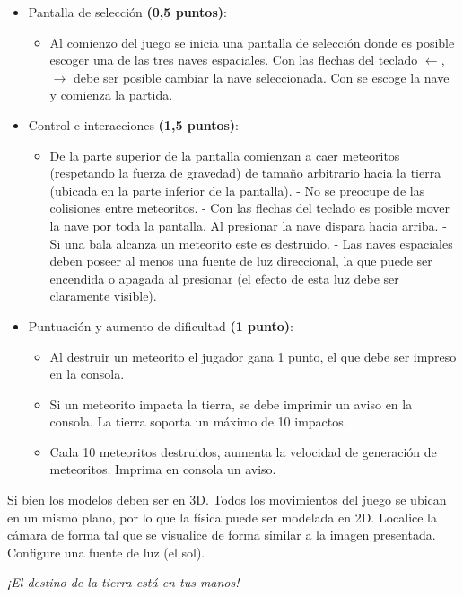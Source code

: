 \documentclass[letterpaper,11pt]{article} %
\begin{document}
\begin{itemize}
\item Pantalla de selección \textbf{(0,5 puntos)}:

\begin{itemize}
	\item Al comienzo del juego se inicia una pantalla de selección donde es posible escoger una de las tres naves espaciales. Con las flechas del teclado $\leftarrow$, $\rightarrow$ debe ser posible cambiar la nave seleccionada. Con  se escoge la nave y comienza la partida.
\end{itemize}

\item Control e interacciones \textbf{(1,5 puntos)}:

\begin{itemize}
	\item De la parte superior de la pantalla comienzan a caer meteoritos (respetando la fuerza de gravedad) de tamaño arbitrario hacia la tierra (ubicada en la parte inferior de la pantalla).
	- No se preocupe de las colisiones entre meteoritos.
	- Con las flechas del teclado es posible mover la nave por toda la pantalla. Al presionar  la nave dispara hacia arriba.
	- Si una bala alcanza un meteorito este es destruido.
	- Las naves espaciales deben poseer al menos una fuente de luz direccional, la que puede ser encendida o apagada al presionar  (el efecto de esta luz debe ser claramente visible).
\end{itemize}

\item Puntuación y aumento de dificultad \textbf{(1 punto)}:

\begin{itemize}
	\item Al destruir un meteorito el jugador gana 1 punto, el que debe ser impreso en la consola.
	\item Si un meteorito impacta la tierra, se debe imprimir un aviso en la consola. La tierra soporta un máximo de 10 impactos.
	\item Cada 10 meteoritos destruidos, aumenta la velocidad de generación de meteoritos. Imprima en consola un aviso.
\end{itemize}

\end{itemize}

Si bien los modelos deben ser en 3D. Todos los movimientos del juego se ubican en un mismo plano, por lo que la física puede ser modelada en 2D. Localice la cámara de forma tal que se visualice de forma similar a la imagen presentada. Configure una fuente de luz (el sol).
\newp
\begin{center}
	\textit{¡El destino de la tierra está en tus manos!}
\end{center}
\end{document}
